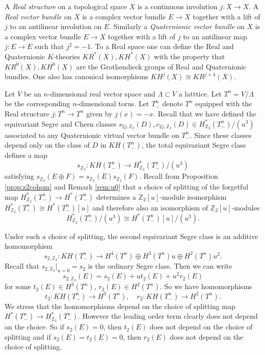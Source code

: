 \documentclass{amsart}
\theoremstyle{definition}
\theoremstyle{remark}
\numberwithin{equation}{section}
\begin{document}
A {\em Real structure} on a topological space $X$ is a continuous involution $j : X \to X$. A {\em Real vector bundle} on $X$ is a complex vector bundle $E \to X$ together with a lift of $j$ to an antilinear involution on $E$. Similarly a {\em Quaternionic vector bundle} on $X$ is a complex vector bundle $E \to X$ together with a lift of $j$ to an antilinear map $j : E \to E$ such that $j^2 = -1$. To a Real space one can define the Real and Quaternionic $K$-theories $KR^*(X), KH^*(X)$ with the property that $KR^0(X), KH^0(X)$ are the Grothendieck groups of Real and Quaternionic bundles. One also has canonical isomorphisms $KH^j(X) \cong KR^{j+4}(X)$.

Let $V$ be an $n$-dimensional real vector space and $\Lambda \subset V$ a latttice. Let $T^n = V/\Lambda$ be the corresponding $n$-dimensional torus. Let $T^n_-$ denote $T^n$ equipped with the Real structure $j : T^n \to T^n$ given by $j(x) = -x$. Recall that we have defined the equivariant Segre and Chern classes $s_{2j,\mathbb{Z}_2}(D), c_{2j ,\mathbb{Z}_2}(D) \in H^*_{\mathbb{Z}_2}( T^n_-)/(u^3)$ associated to any Quaternionic virtual vector bundle on $T^n_-$. Since these classes depend only on the class of $D$ in $KH(T^n_-)$, the total equivariant Segre class defines a map
\[
s_{\mathbb{Z}_2} : KH(T^n_-) \to H^*_{\mathbb{Z}_2}(T^n_-)/(u^3)
\]
satisfying $s_{\mathbb{Z}_2}(E \oplus F) = s_{\mathbb{Z}_2}(E)s_{\mathbb{Z}_2}(F)$. Recall from Proposition \ref{prop:z2cohom} and Remark \ref{rem:u0} that a choice of splitting of the forgetful map $H_{\mathbb{Z}_2}^*(T^n_- ) \to H^*( T^n_- )$ determines a $\mathbb{Z}_2[u]$-module isomorphism $H^*_{\mathbb{Z}_2}( T^n_- ) \cong H^*( T^n_- )[u]$ and therefore also an isomorphism of $\mathbb{Z}_2[u]$-modules
\[
H^*_{\mathbb{Z}_2}(T^n_-)/(u^3) \cong H^*( T^n_-)[u]/(u^3).
\]

Under such a choice of splitting, the second equivariant Segre class is an additive homomorphism
\[
s_{2 , \mathbb{Z}_2} : KH( T^n_-) \to H^4( T^n) \oplus H^3(T^n)u \oplus H^2(T^n)u^2.
\]
Recall that $s_{2, \mathbb{Z}_2}|_{u=0} = s_2$ is the ordinary Segre class. Then we can write
\[
s_{2,\mathbb{Z}_2}(E) = s_2(E) + u t_2(E) + u^2 r_2(E)
\]
for some $t_2(E) \in H^3(T^n)$, $r_2(E) \in H^2(T^n)$. So we have homomorphisms
\[
t_2 : KH(T^n_-) \to H^3(T^n), \quad r_2 : KH(T^n_-) \to H^2(T^n).
\]
We stress that the homomorphisms depend on the choice of splitting map $H^*( T^n_- ) \to H^*_{\mathbb{Z}_2}( T^n_- )$. However the leading order term clearly does not depend on the choice. So if $s_2(E) = 0$, then $t_2(E)$ does not depend on the choice of splitting and if $s_2(E) = t_2(E) = 0$, then $r_2(E)$ does not depend on the choice of splitting.
\end{document}
